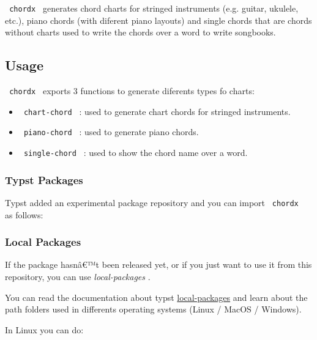 \texttt{\ chordx\ } generates chord charts for stringed instruments
(e.g. guitar, ukulele, etc.), piano chords (with diferent piano layouts)
and single chords that are chords without charts used to write the
chords over a word to write songbooks.

\subsection{Usage}\label{usage}

\texttt{\ chordx\ } exports 3 functions to generate diferents types fo
charts:

\begin{itemize}
\tightlist
\item
  \texttt{\ chart-chord\ } : used to generate chart chords for stringed
  instruments.
\item
  \texttt{\ piano-chord\ } : used to generate piano chords.
\item
  \texttt{\ single-chord\ } : used to show the chord name over a word.
\end{itemize}

\subsubsection{Typst Packages}\label{typst-packages}

Typst added an experimental package repository and you can import
\texttt{\ chordx\ } as follows:

\begin{Shaded}
\begin{Highlighting}[]
\end{Highlighting}
\end{Shaded}

\subsubsection{Local Packages}\label{local-packages}

If the package hasnâ€™t been released yet, or if you just want to use it
from this repository, you can use \emph{\emph{local-packages}} .

You can read the documentation about typst
\href{https://github.com/typst/packages\#local-packages}{local-packages}
and learn about the path folders used in differents operating systems
(Linux / MacOS / Windows).

In Linux you can do:

